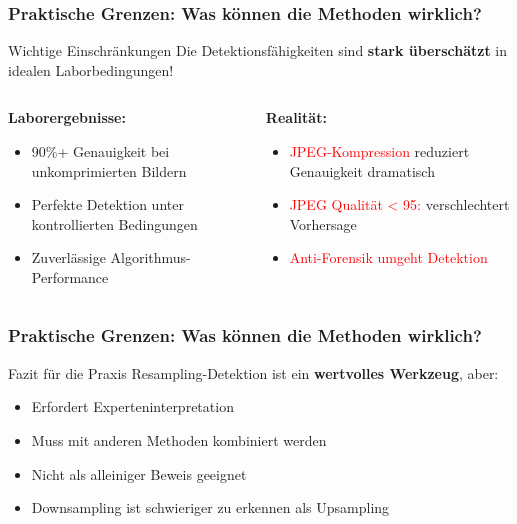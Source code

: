 \documentclass[11pt,t,usepdftitle=false,aspectratio=169]{beamer}
\begin{document}
\begin{frame}
	\frametitle{Praktische Grenzen: Was können die Methoden wirklich?}
	
	\begin{alertblock}{Wichtige Einschränkungen}
		Die Detektionsfähigkeiten sind \textbf{stark überschätzt} in idealen Laborbedingungen!
	\end{alertblock}
	
	\vspace{0.5em}
	
	\begin{columns}[T]
		\begin{column}{0.48\textwidth}
			\textbf{Laborergebnisse:}
			\begin{itemize}
				\item 90\%+ Genauigkeit bei unkomprimierten Bildern
				\item Perfekte Detektion unter kontrollierten Bedingungen
				\item Zuverlässige Algorithmus-Performance
			\end{itemize}
		\end{column}
		
		\begin{column}{0.48\textwidth}
			\textbf{Realität:}
			\begin{itemize}
				\item \textcolor{red}{JPEG-Kompression} reduziert Genauigkeit dramatisch~\cite{luo_upscaling_2021}
				\item \textcolor{red}{JPEG Qualität < 95:} verschlechtert Vorhersage
				\item \textcolor{red}{Anti-Forensik umgeht Detektion}~\cite{kirchner_hiding_2008}
			\end{itemize}
		\end{column}
	\end{columns}

\end{frame}

\begin{frame}
	\frametitle{Praktische Grenzen: Was können die Methoden wirklich?}
	\begin{exampleblock}{Fazit für die Praxis}
		Resampling-Detektion ist ein \textbf{wertvolles Werkzeug}, aber:
		\begin{itemize}
			\item Erfordert Experteninterpretation
			\item Muss mit anderen Methoden kombiniert werden  
			\item Nicht als alleiniger Beweis geeignet
			\item Downsampling ist schwieriger zu erkennen als Upsampling
		\end{itemize}
	\end{exampleblock}
\end{frame}
\end{document}
